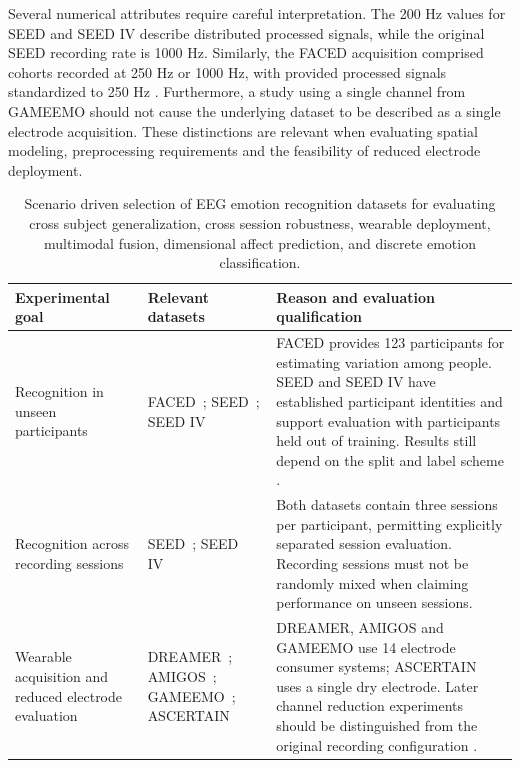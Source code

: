 \documentclass[ASNA,twocolumn]{USG}
\newcommand{\lightrowsep}{%
  \arrayrulecolor{lightrowgray}%
  \specialrule{0.30pt}{3.5pt}{3.5pt}%
  \arrayrulecolor{black}%
}
\begin{document}
Several numerical attributes require careful interpretation. The 200 Hz values for SEED and SEED IV describe distributed processed signals, while the original SEED recording rate is 1000 Hz. Similarly, the FACED acquisition comprised cohorts recorded at 250 Hz or 1000 Hz, with provided processed signals standardized to 250 Hz \cite{seed_page,seediv_page,chen2023large}. Furthermore, a study using a single channel from GAMEEMO should not cause the underlying dataset to be described as a single electrode acquisition. These distinctions are relevant when evaluating spatial modeling, preprocessing requirements and the feasibility of reduced electrode deployment.

\begin{table}[tp]
\centering
\setlength{\tabcolsep}{3pt}
\renewcommand{\arraystretch}{1.15}
\caption{Scenario driven selection of EEG emotion recognition datasets for evaluating cross subject generalization, cross session robustness,
wearable deployment, multimodal fusion, dimensional affect prediction, and discrete emotion classification.}
\label{tab:scenario_map}
\begin{tabularx}{\textwidth}{@{}
>{\raggedright\arraybackslash}p{}
>{\raggedright\arraybackslash}p{}
>{\raggedright\arraybackslash}X@{}}
\toprule
\textbf{Experimental goal} & \textbf{Relevant datasets} & \textbf{Reason and evaluation qualification} \\
\midrule
Recognition in unseen participants & FACED~\cite{chen2023large}; SEED~\cite{zheng2015investigating}; SEED IV~\cite{zheng2018emotionmeter} & FACED provides 123 participants for estimating variation among people. SEED and SEED IV have established participant identities and support evaluation with participants held out of training. Results still depend on the split and label scheme \cite{apicella2024toward}. \\
\lightrowsep
Recognition across recording sessions & SEED~\cite{zheng2017identifying}; SEED IV~\cite{seediv_page} & Both datasets contain three sessions per participant, permitting explicitly separated session evaluation. Recording sessions must not be randomly mixed when claiming performance on unseen sessions. \\
\lightrowsep
Wearable acquisition and reduced electrode evaluation & DREAMER~\cite{katsigiannis2017dreamer}; AMIGOS~\cite{miranda2018amigos}; GAMEEMO~\cite{toraman2021gameemo}; ASCERTAIN~\cite{subramanian2016ascertain} & DREAMER, AMIGOS and GAMEEMO use 14 electrode consumer systems; ASCERTAIN uses a single dry electrode. Later channel reduction experiments should be distinguished from the original recording configuration \cite{dadebayev2022eeg,geng2025deep}. \\

\end{tabularx}
\end{table}
\end{document}
